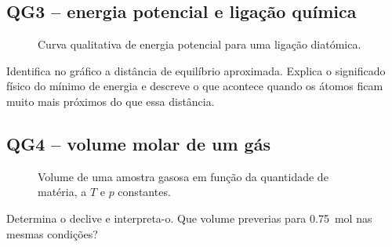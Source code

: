 \documentclass[11pt,a4paper,oneside]{book}
\begin{document}
\subsection*{QG3 -- energia potencial e ligação química}
\begin{figure}[H]
\centering
{}
\caption{Curva qualitativa de energia potencial para uma ligação diatómica.}
\end{figure}
\begin{exercicios}[title=Exercício QG3]
Identifica no gráfico a distância de equilíbrio aproximada. Explica o significado físico do mínimo de energia e descreve o que acontece quando os átomos ficam muito mais próximos do que essa distância.
\end{exercicios}

\subsection*{QG4 -- volume molar de um gás}
\begin{figure}[H]
\centering
{}
\caption{Volume de uma amostra gasosa em função da quantidade de matéria, a $T$ e $p$ constantes.}
\end{figure}
\begin{exercicios}[title=Exercício QG4]
Determina o declive e interpreta-o. Que volume preverias para \SI{0.75}{mol} nas mesmas condições?
\end{exercicios}
\end{document}
